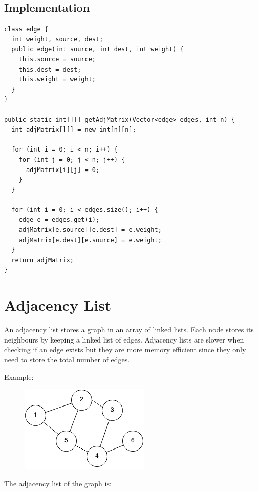 \documentclass[11pt,oneside]{book}
\makeatletter
\def\maxwidth#1{\ifdim\Gin@nat@width>#1 #1\else\Gin@nat@width\fi}
\makeatother
\begin{document}
\subsection{Implementation}

\begin{lstlisting}
class edge {
  int weight, source, dest;
  public edge(int source, int dest, int weight) {
    this.source = source;
    this.dest = dest;
    this.weight = weight;
  }
}

public static int[][] getAdjMatrix(Vector<edge> edges, int n) {
  int adjMatrix[][] = new int[n][n];

  for (int i = 0; i < n; i++) {
    for (int j = 0; j < n; j++) {
      adjMatrix[i][j] = 0;
    }
  }

  for (int i = 0; i < edges.size(); i++) {
    edge e = edges.get(i);
    adjMatrix[e.source][e.dest] = e.weight;
    adjMatrix[e.dest][e.source] = e.weight;
  }
  return adjMatrix;
}
\end{lstlisting}

        \section{ Adjacency List }
        

An adjacency list stores a graph in an array of linked lists. Each node stores its neighbours by keeping a linked list of edges. Adjacency lists are slower when checking if an edge exists but they are more memory efficient since they only need to store the total number of edges.

Example:

\vspace{5px}\begin{figure}[H]\centering
        \includegraphics[width=0.66\maxwidth{\textwidth}]{graph.png}
        \end{figure}

The adjacency list of the graph is:
\end{document}
